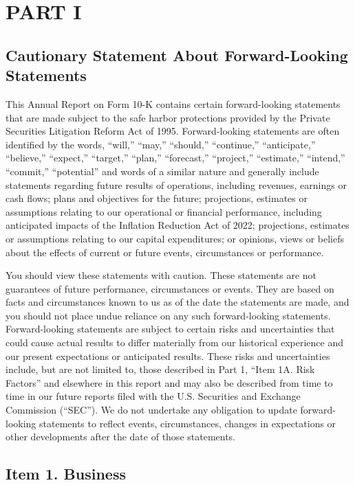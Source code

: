 \documentclass{article}
\begin{document}
\section{PART I}

\subsection{Cautionary Statement About Forward-Looking Statements}
This Annual Report on Form 10-K contains certain forward-looking statements that are made subject to the safe harbor protections provided by the Private Securities Litigation Reform Act of 1995. Forward-looking statements are often identified by the words, “will,” “may,” “should,” “continue,” “anticipate,” “believe,” “expect,” “target,” “plan,” “forecast,” “project,” “estimate,” “intend,” “commit,” “potential” and words of a similar nature and generally include statements regarding future results of operations, including revenues, earnings or cash flows; plans and objectives for the future; projections, estimates or assumptions relating to our operational or financial performance, including anticipated impacts of the Inflation Reduction Act of 2022; projections, estimates or assumptions relating to our capital expenditures; or opinions, views or beliefs about the effects of current or future events, circumstances or performance.

You should view these statements with caution. These statements are not guarantees of future performance, circumstances or events. They are based on facts and circumstances known to us as of the date the statements are made, and you should not place undue reliance on any such forward-looking statements. Forward-looking statements are subject to certain risks and uncertainties that could cause actual results to differ materially from our historical experience and our present expectations or anticipated results. These risks and uncertainties include, but are not limited to, those described in Part 1, “Item 1A. Risk Factors” and elsewhere in this report and may also be described from time to time in our future reports filed with the U.S. Securities and Exchange Commission (“SEC”). We do not undertake any obligation to update forward-looking statements to reflect events, circumstances, changes in expectations or other developments after the date of those statements.

\subsection{Item 1. Business}
\end{document}

